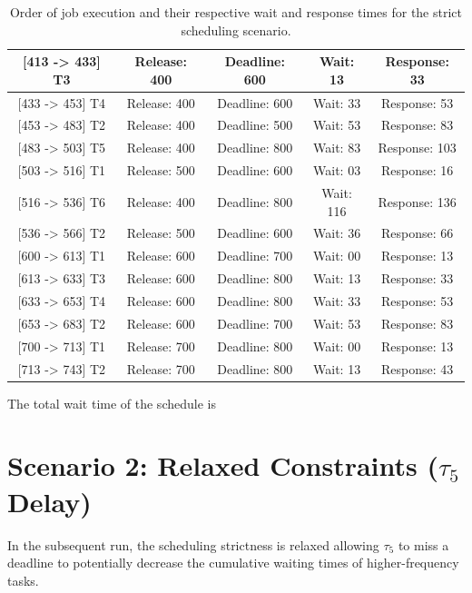\documentclass{report}
\begin{document}
\begin{table}[ht]
\begin{tabular}{| c | c | c | c | c |}
        {[413 -> 433]} T3 & Release: 400 & Deadline: 600 & Wait: 13 & Response: 33 \\
        \hline
        {[433 -> 453]} T4 & Release: 400 & Deadline: 600 & Wait: 33 & Response: 53 \\
        \hline
        {[453 -> 483]} T2 & Release: 400 & Deadline: 500 & Wait: 53 & Response: 83 \\
        \hline
        {[483 -> 503]} T5 & Release: 400 & Deadline: 800 & Wait: 83 & Response: 103 \\
        \hline
        {[503 -> 516]} T1 & Release: 500 & Deadline: 600 & Wait: 03 & Response: 16 \\
        \hline
        {[516 -> 536]} T6 & Release: 400 & Deadline: 800 & Wait: 116 & Response: 136 \\
        \hline
        {[536 -> 566]} T2 & Release: 500 & Deadline: 600 & Wait: 36 & Response: 66 \\
        \hline
        {[600 -> 613]} T1 & Release: 600 & Deadline: 700 & Wait: 00 & Response: 13 \\
        \hline
        {[613 -> 633]} T3 & Release: 600 & Deadline: 800 & Wait: 13 & Response: 33 \\
        \hline
        {[633 -> 653]} T4 & Release: 600 & Deadline: 800 & Wait: 33 & Response: 53 \\
        \hline
        {[653 -> 683]} T2 & Release: 600 & Deadline: 700 & Wait: 53 & Response: 83 \\
        \hline
        {[700 -> 713]} T1 & Release: 700 & Deadline: 800 & Wait: 00 & Response: 13 \\
        \hline
        {[713 -> 743]} T2 & Release: 700 & Deadline: 800 & Wait: 13 & Response: 43 \\
        \hline
    \end{tabular}
    \caption{Order of job execution and their respective wait and response times for the strict scheduling scenario.}
    \label{tab1}
\end{table}

The total wait time of the schedule is 

\section{Scenario 2: Relaxed Constraints ($\tau_5$ Delay)}

In the subsequent run, the scheduling strictness is relaxed allowing $\tau_5$ to miss a deadline to potentially decrease the cumulative waiting times of higher-frequency tasks. 
\end{document}
